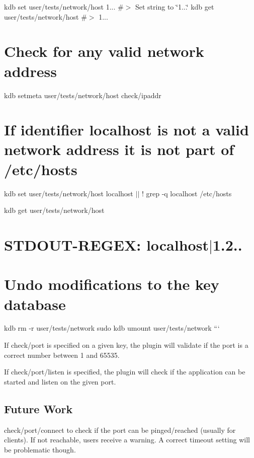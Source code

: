 kdb set user/tests/network/host 1... \#$>$ Set string to \char`\"{}1...\char`\"{} kdb get user/tests/network/host \#$>$ 1...

\section*{Check for any valid network address}

kdb setmeta user/tests/network/host check/ipaddr \textquotesingle{}\textquotesingle{} \section*{If identifier {\ttfamily localhost} is not a valid network address it is not part of /etc/hosts}

kdb set user/tests/network/host localhost $\vert$$\vert$ ! grep -\/q localhost /etc/hosts

kdb get user/tests/network/host \section*{S\+T\+D\+O\+U\+T-\/\+R\+E\+G\+EX\+: localhost$\vert$1.2..}

\section*{Undo modifications to the key database}

kdb rm -\/r user/tests/network sudo kdb umount user/tests/network ```

If {\ttfamily check/port} is specified on a given key, the plugin will validate if the port is a correct number between 1 and 65535.

If {\ttfamily check/port/listen} is specified, the plugin will check if the application can be started and listen on the given port.

\subsection*{Future Work}

{\ttfamily check/port/connect} to check if the port can be pinged/reached (usually for clients). If not reachable, users receive a warning. A correct timeout setting will be problematic though. 